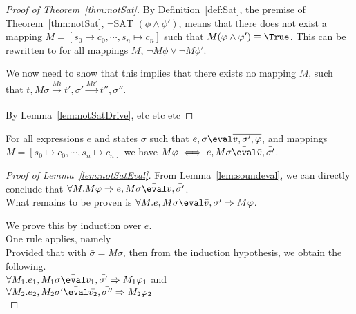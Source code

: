 
\onecolumn



\begin{proof}[Proof of Theorem~\ref{thm:notSat}]
  By Definition~\ref{def:Sat}, the premise of Theorem~\ref{thm:notSat}, $\neg\text{SAT }(\phi\land\phi')$,
  means that there does not exist a mapping $M=[s_0\mapsto c_0,\cdots,s_n\mapsto c_n]$ such that $M(\phi\land\phi')\equiv\True$.
  This can be rewritten to for all mappings $M$, $\neg M\phi \lor \neg M\phi'$.

  We now need to show that this implies that there exists no mapping $M$,
  such that $t,M\sigma\xrightarrow[]{Mi}\bar{t'},\bar{\sigma'}\xrightarrow[]{Mi'}\bar{t''},\bar{\sigma''}$.

  By Lemma~\ref{lem:notSatDrive}, etc etc etc 
\end{proof}

\begin{lemma}
  \label{lem:notSatEval}
  For all expressions $e$ and states $\sigma$ such that $e,\sigma\eval\overline{v,\sigma',\phi}$, and mappings $M=[s_0\mapsto c_0,\cdots,s_n\mapsto c_n]$ we have $M\phi \iff e,M\sigma\bar{\eval}\bar{v},\bar{\sigma'}$.

\end{lemma}

\begin{proof}[Proof of Lemma~\ref{lem:notSatEval}]
  From Lemma~\ref{lem:soundeval}, we can directly conclude that $\forall M . M\phi \implies e,M\sigma\bar{\eval}\bar{v},\bar{\sigma'}$.\\
  What remains to be proven is $\forall M . e,M\sigma\bar{\eval}\bar{v},\bar{\sigma'}\implies M\phi$.

  We prove this by induction over $e$.\\

    {
      One rule applies, namely \\
      Provided that  with $\bar{\sigma}=M\sigma$, then from the induction hypothesis, we obtain the following.\\

      $\forall M_1 . e_1,M_1\sigma\bar{\eval}\bar{v_1},\bar{\sigma'}\implies M_1\phi_1$ and\\
      $\forall M_2 . e_2,M_2\sigma'\bar{\eval}\bar{v_2},\bar{\sigma''}\implies M_2\phi_2$\\

    }

\end{proof}

